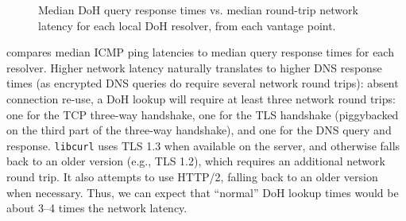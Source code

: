 \begin{figure}[t]
    \hspace*{-0.75in}
    \begin{minipage}{1.35\linewidth}
    \hfill
    \hfill
    \caption{Median DoH query response times vs. median round-trip network
    latency for each local DoH resolver, from each vantage point.}
    \label{fig:ping_qrt_scatters}
    \end{minipage}
\end{figure}

 compares median ICMP ping latencies to median 
query response times for each resolver.
Higher network latency naturally translates to higher DNS response
times (as encrypted DNS queries do require several network round trips):
absent connection re-use, a DoH lookup will require at least three network
round trips: one for the TCP three-way handshake, one for the TLS handshake
(piggybacked on the third part of the three-way handshake), and one for the
DNS query and response. {\tt libcurl} uses TLS 1.3 when available on the
server, and otherwise falls back to an older version (e.g., TLS 1.2), which requires an additional
network round trip.
It also attempts to use HTTP/2, falling back to an older version when necessary.
Thus, we can expect that ``normal'' DoH lookup times would
be about 3--4 times the network latency.

